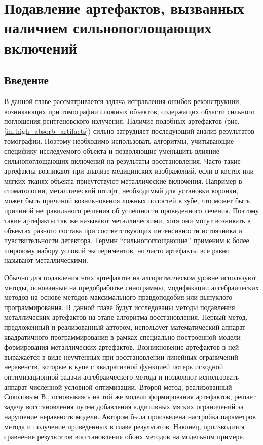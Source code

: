 \chapter{Подавление артефактов, вызванных наличием сильнопоглощающих включений} \label{chapt2}
\section{Введение}

В данной главе рассматривается задача исправления ошибок реконструкции, возникающих при томографии сложных объектов, содержащих области сильного поглощения рентгеновского излучения.
Наличие подобных артефактов (рис. \ref{im:high_absorb_artifacts}) сильно затрудняет последующий анализ результатов томографии.
Поэтому необходимо использовать алгоритмы, учитывающие специфику исследуемого объекта и позволяющие уменьшить влияние сильнопоглощающих включений на результаты восстановления.
Часто такие артефакты возникают при анализе медицинских изображений, если в костях или мягких тканях объекта присутствуют металлические включения.
Например в стоматологии, металлический штифт, необходимый для установки коронки, может быть причиной возникновения ложных полостей в зубе, что может быть причиной неправильного решения об успешности проведенного лечения.
Поэтому такие артефакты так же называют металлическими, хотя они могут возникать в объектах разного состава при соответствующих интенсивности истоячника и чувствительности детектора.
Термин ``сильнопоглощающие'' применим к более широкому набору условий экспериментов, но часто артефакты все равно называют металлическими.


Обычно для подавления этих артефактов на алгоритмическом уровне используют методы, основанные на предобработке синограммы, модификации алгебраических методов на основе методов максимального правдоподобия или выпуклого программирования.
В данной главе будут исследованы методы подавления металлических артефактов на этапе алгоритма восстановления.
Первый метод, предложенный и реализованный автором, использует математический аппарат квадратичного программирования в рамках специально построенной модели формирования металлических артефактов.
Возникновение артефактов в ней выражается в виде неучтенных при восстановлении линейных ограничений-неравенств, которые в купе с квадратичной функцией потерь исходной оптимизационной задачи алгебраического метода и позволяют использовать аппарат численной условной оптимизации.
Второй метод, реализованный Соколовым В., основываясь на той же модели формирования артефактов, решает задачу восстановления путем добавления аддитивных мягких ограничений за нарушение неравенств модели.
Автором была произведена настройка параметров метода и получение приведенных в главе результатов.
Наконец, производится сравнение результатов восстановления обоих методов на модельном примере.

